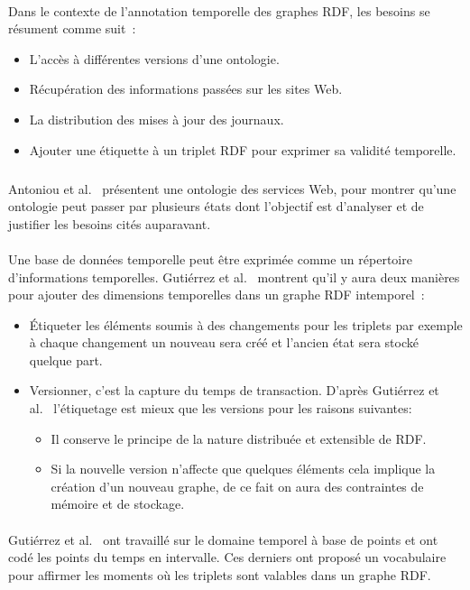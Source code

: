 \paragraph{}
Dans le contexte de l'annotation temporelle des graphes RDF, les besoins se résument comme suit~:
\begin{itemize}
\item L'accès à différentes versions d’une ontologie.
\item Récupération des informations passées sur les sites Web.
\item La distribution des mises à jour des journaux.
\item Ajouter une étiquette à un triplet RDF pour exprimer sa validité temporelle.
\end{itemize}
\subparagraph{}
Antoniou et al.~\cite{antoniou2004} présentent une ontologie des services Web, pour montrer qu'une ontologie peut passer par plusieurs états dont l'objectif est d'analyser et de justifier les besoins cités auparavant.
\paragraph{}
Une base de données temporelle peut être exprimée comme un répertoire d'informations temporelles.
Gutiérrez et al.~\cite{gutierrez2007} montrent qu'il y aura deux manières pour ajouter des dimensions temporelles dans un graphe RDF intemporel~:
\begin{itemize}
\item Étiqueter les éléments soumis à des changements pour les triplets par exemple à chaque changement un nouveau 	 sera créé et l’ancien état sera stocké quelque part.
\item Versionner, c'est la capture du temps de transaction. D'après Gutiérrez et al.~\cite{gutierrez2007} l’étiquetage est mieux que les versions pour les raisons suivantes:
\begin{itemize}
\item Il conserve le principe de la nature distribuée et extensible de RDF.
\item Si la nouvelle version n’affecte que quelques éléments cela implique la création d’un nouveau graphe, de ce fait on aura des contraintes de mémoire et de stockage. 
\end{itemize}
\end{itemize}
\paragraph{}
Gutiérrez et al.~\cite{gutierrez2007} ont travaillé sur le domaine temporel à base de points et ont codé les points du temps en intervalle. Ces derniers ont proposé un vocabulaire pour affirmer les moments où les triplets sont valables dans un graphe RDF.
